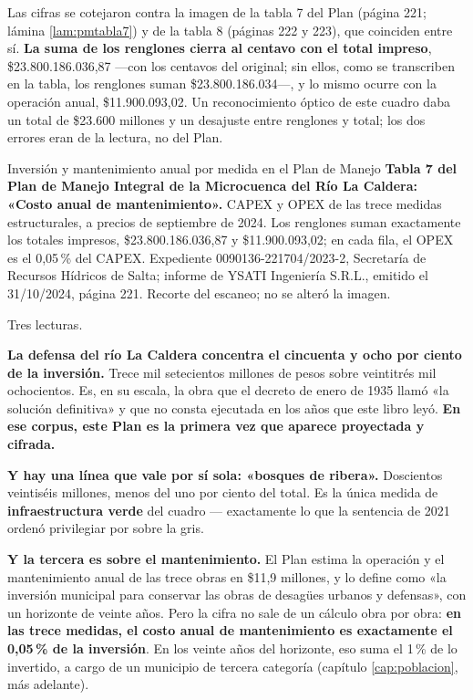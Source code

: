 \begin{cautela}
Las cifras se cotejaron contra la imagen de la tabla 7 del Plan (página 221; lámina \ref{lam:pmtabla7}) y de la tabla 8 (páginas 222 y 223), que coinciden entre sí. \textbf{La suma de los renglones cierra al centavo con el total impreso}, \$23.800.186.036,87 ---con los centavos del original; sin ellos, como se transcriben en la tabla, los renglones suman \$23.800.186.034---, y lo mismo ocurre con la operación anual, \$11.900.093,02. Un reconocimiento óptico de este cuadro daba un total de \$23.600 millones y un desajuste entre renglones y total; los dos errores eran de la lectura, no del Plan.
\end{cautela}

%
{Inversión y mantenimiento anual por medida en el Plan de Manejo}%
{\textbf{Tabla 7 del Plan de Manejo Integral de la Microcuenca del Río La Caldera: «Costo anual de mantenimiento».} CAPEX y OPEX de las trece medidas estructurales, a precios de septiembre de 2024. Los renglones suman exactamente los totales impresos, \$23.800.186.036,87 y \$11.900.093,02; en cada fila, el OPEX es el 0,05\,\% del CAPEX.}%
{Expediente 0090136-221704/2023-2, Secretaría de Recursos Hídricos de Salta; informe de YSATI Ingeniería S.R.L., emitido el 31/10/2024, página 221. Recorte del escaneo; no se alteró la imagen.}

Tres lecturas.

\textbf{La defensa del río La Caldera concentra el cincuenta y ocho por ciento de la
inversión.} Trece mil setecientos millones de pesos sobre veintitrés mil ochocientos. Es, en su escala, la obra que el decreto de enero de 1935 llamó «la solución definitiva» y que no consta ejecutada en los años que este libro leyó. \textbf{En ese corpus, este Plan es la primera vez que aparece proyectada y cifrada.}

\textbf{Y hay una línea que vale por sí sola: «bosques de ribera».} Doscientos veintiséis
millones, menos del uno por ciento del total. Es la única medida de \textbf{infraestructura
verde} del cuadro --- exactamente lo que la sentencia de 2021 ordenó privilegiar por sobre la
gris.

\textbf{Y la tercera es sobre el mantenimiento.} El Plan estima la operación y el mantenimiento anual de las trece obras en \$11,9 millones, y lo define como «la inversión municipal para conservar las obras de desagües urbanos y defensas», con un horizonte de veinte años. Pero la cifra no sale de un cálculo obra por obra: \textbf{en las trece medidas, el costo anual de mantenimiento es exactamente el 0,05\,\% de la inversión}. En los veinte años del horizonte, eso suma el 1\,\% de lo invertido, a cargo de un municipio de tercera categoría (capítulo \ref{cap:poblacion}, más adelante).

